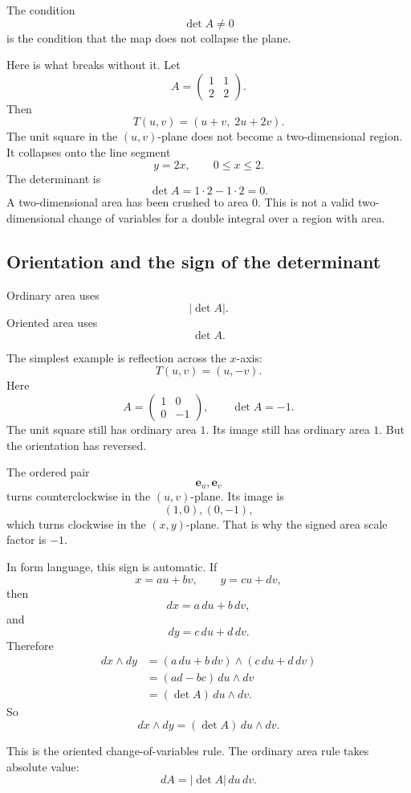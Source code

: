 The condition
\[
    \det A\ne0
\]
is the condition that the map does not collapse the plane.

Here is what breaks without it.  Let
\[
    A=
    \begin{pmatrix}
        1&1\\
        2&2
    \end{pmatrix}.
\]
Then
\[
    T(u,v)=(u+v,\;2u+2v).
\]
The unit square in the \((u,v)\)-plane does not become a two-dimensional region.  It
collapses onto the line segment
\[
    y=2x,
    \qquad
    0\le x\le2.
\]
The determinant is
\[
    \det A=1\cdot2-1\cdot2=0.
\]
A two-dimensional area has been crushed to area \(0\).  This is not a valid
two-dimensional change of variables for a double integral over a region with area.

\subsection{Orientation and the sign of the determinant}

Ordinary area uses
\[
    |\det A|.
\]
Oriented area uses
\[
    \det A.
\]

The simplest example is reflection across the \(x\)-axis:
\[
    T(u,v)=(u,-v).
\]
Here
\[
    A=
    \begin{pmatrix}
        1&0\\
        0&-1
    \end{pmatrix},
    \qquad
    \det A=-1.
\]
The unit square still has ordinary area \(1\).  Its image still has ordinary area \(1\).
But the orientation has reversed.

The ordered pair
\[
    \mathbf e_u,\mathbf e_v
\]
turns counterclockwise in the \((u,v)\)-plane.  Its image is
\[
    (1,0),(0,-1),
\]
which turns clockwise in the \((x,y)\)-plane.  That is why the signed area scale factor
is \(-1\).

In form language, this sign is automatic.  If
\[
    x=au+bv,
    \qquad
    y=cu+dv,
\]
then
\[
    dx=a\,du+b\,dv,
\]
and
\[
    dy=c\,du+d\,dv.
\]
Therefore
\[
\begin{aligned}
dx\wedge dy
&=
(a\,du+b\,dv)\wedge(c\,du+d\,dv)\\
&=
(ad-bc)\,du\wedge dv\\
&=
(\det A)\,du\wedge dv.
\end{aligned}
\]
So
\[
\boxed{
    dx\wedge dy=(\det A)\,du\wedge dv.
}
\]

This is the oriented change-of-variables rule.  The ordinary area rule takes absolute
value:
\[
\boxed{
    dA=|\det A|\,du\,dv.
}
\]

